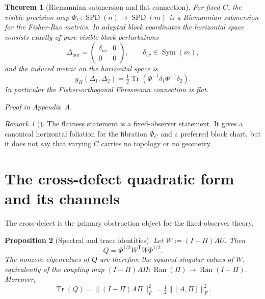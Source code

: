 \documentclass[11pt,a4paper]{article}
\numberwithin{equation}{section}
\DeclareMathOperator{\Tr}{Tr}
\DeclareMathOperator{\SPD}{SPD}
\DeclareMathOperator{\Sym}{Sym}
\DeclareMathOperator{\Ran}{Ran}
\theoremstyle{thmcompact}
\newtheorem{theorem}{Theorem}[section]
\newtheorem{proposition}[theorem]{Proposition}
\theoremstyle{remark}
\newtheorem*{remarkplain}{Remark}
\newenvironment{remark}[1][]%
{\begin{remarkbox}\begin{remarkplain}[#1]\normalfont}
{\end{remarkplain}\end{remarkbox}}
\newcommand{\proofappendix}{\par{\hfill\scriptsize\emph{Proof in Appendix~A.}}\par}
\begin{document}
\begin{theorem}[Riemannian submersion and flat connection]
\label{thm:riemannian-submersion}
For fixed $C$, the visible precision map $\Phi_C:\SPD(n)\to\SPD(m)$ is a Riemannian submersion for the Fisher-Rao metrics. In adapted block coordinates the horizontal space consists exactly of pure visible-block perturbations
\begin{equation}
\Delta_{\mathrm{hor}}=
\begin{pmatrix}
\delta_{vv} & 0\\
0 & 0
\end{pmatrix},
\qquad
\delta_{vv}\in\Sym(m),
\label{eq:horizontal-block}
\end{equation}
and the induced metric on the horizontal space is
\begin{equation}
g_H(\Delta_1,\Delta_2)=\tfrac12\Tr(\Phi^{-1}\delta_1\Phi^{-1}\delta_2).
\label{eq:horizontal-metric}
\end{equation}
In particular the Fisher-orthogonal Ehresmann connection is flat.
\end{theorem}

\proofappendix

\begin{remark}
The flatness statement is a fixed-observer statement. It gives a canonical horizontal foliation for the fibration $\Phi_C$ and a preferred block chart, but it does not say that varying $C$ carries no topology or no geometry.
\end{remark}

\section{The cross-defect quadratic form and its channels}

The cross-defect is the primary obstruction object for the fixed-observer theory.

\begin{proposition}[Spectral and trace identities]
\label{prop:q-spectral}
Let $W:=(I-\Pi)AU$. Then
\begin{equation}
Q=\Phi^{1/2}W^{\mathsf T}W\Phi^{1/2}.
\label{eq:Q-WTW}
\end{equation}
The nonzero eigenvalues of $Q$ are therefore the squared singular values of $W$, equivalently of the coupling map $(I-\Pi)A\Pi:\Ran(\Pi)\to\Ran(I-\Pi)$. Moreover,
\begin{equation}
\Tr(Q)=\|(I-\Pi)A\Pi\|_F^2=\tfrac12\|[A,\Pi]\|_F^2.
\label{eq:trace-commutator}
\end{equation}
\end{proposition}
\end{document}
